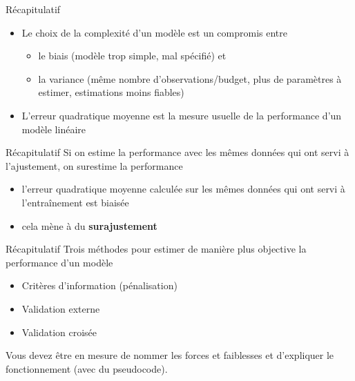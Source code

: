\documentclass[
  ignorenonframetext,
]{beamer}
\providecommand{\tightlist}{%
  \setlength{\itemsep}{0pt}\setlength{\parskip}{0pt}}\usepackage{longtable,booktabs,array}
\begin{document}
\begin{frame}{Récapitulatif}
\protect\hypertarget{ruxe9capitulatif}{}
\begin{itemize}
\tightlist
\item
  Le choix de la complexité d'un modèle est un compromis entre

  \begin{itemize}
  \tightlist
  \item
    le biais (modèle trop simple, mal spécifié) et
  \item
    la variance (même nombre d'observations/budget, plus de paramètres à
    estimer, estimations moins fiables)
  \end{itemize}
\item
  L'erreur quadratique moyenne est la mesure usuelle de la performance
  d'un modèle linéaire
\end{itemize}
\end{frame}

\begin{frame}{Récapitulatif}
\protect\hypertarget{ruxe9capitulatif-1}{}
Si on estime la performance avec les mêmes données qui ont servi à
l'ajustement, on surestime la performance

\begin{itemize}
\tightlist
\item
  l'erreur quadratique moyenne calculée sur les mêmes données qui ont
  servi à l'entraînement est biaisée
\item
  cela mène à du \textbf{surajustement}
\end{itemize}
\end{frame}

\begin{frame}{Récapitulatif}
\protect\hypertarget{ruxe9capitulatif-2}{}
Trois méthodes pour estimer de manière plus objective la performance
d'un modèle

\begin{itemize}
\tightlist
\item
  Critères d'information (pénalisation)
\item
  Validation externe
\item
  Validation croisée
\end{itemize}

\footnotesize

Vous devez être en mesure de nommer les forces et faiblesses et
d'expliquer le fonctionnement (avec du pseudocode).
\end{frame}
\end{document}
